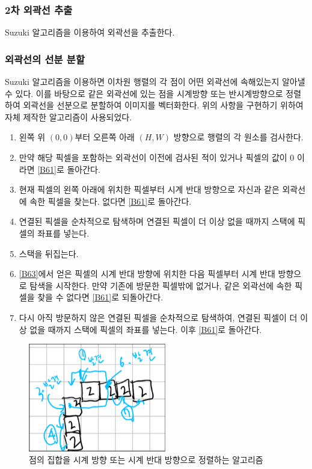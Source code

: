 \documentclass[conference]{IEEEtran}
\begin{document}
\subsubsection{2차 외곽선 추출}
Suzuki 알고리즘을 이용하여 외곽선을 추출한다.\cite{suzuki}

\subsubsection{외곽선의 선분 분할}
Suzuki 알고리즘을 이용하면 이차원 행렬의 각 점이 어떤 외곽선에 속해있는지 알아낼 수 있다.
이를 바탕으로 같은 외곽선에 있는 점을 시계방향 또는 반시계방향으로 정렬하여 외곽선을 선분으로 분할하여 이미지를 벡터화한다.
위의 사항을 구현하기 위하여 자체 제작한 알고리즘이 사용되었다. 
\begin{enumerate}
    \item 왼쪽 위 $(0, 0)$부터 오른쪽 아래 $(H, W)$ 방향으로 행렬의 각 원소를 검사한다. \label{B61}
    \item 만약 해당 픽셀을 포함하는 외곽선이 이전에 검사된 적이 있거나 픽셀의 값이 0 이라면 \ref{B61}로 돌아간다.
    \item 현재 픽셀의 왼쪽 아래에 위치한 픽셀부터 시계 반대 방향으로 자신과 같은 외곽선에 속한 픽셀을 찾는다. 없다면 \ref{B61}로 돌아간다. \label{B63}
    \item 연결된 픽셀을 순차적으로 탐색하며 연결된 픽셀이 더 이상 없을 때까지 스택에 픽셀의 좌표를 넣는다.
    \item 스택을 뒤집는다.
    \item \ref{B63}에서 얻은 픽셀의 시계 반대 방향에 위치한 다음 픽셀부터 시계 반대 방향으로 탐색을 시작한다.
    만약 기존에 방문한 픽셀밖에 없거나, 같은 외곽선에 속한 픽셀을 찾을 수 없다면 \ref{B61}로 되돌아간다.
    \item 다시 아직 방문하지 않은 연결된 픽셀을 순차적으로 탐색하여, 연결된 픽셀이 더 이상 없을 때까지 스택에 픽셀의 좌표를 넣는다. 이후 \ref{B61}로 돌아간다.
\end{enumerate}
\begin{figure}
    \centering
    \includegraphics[width=6cm]{algo.png}
    \caption{점의 집합을 시계 방향 또는 시계 반대 방향으로 정렬하는 알고리즘}
\end{figure}
\end{document}
